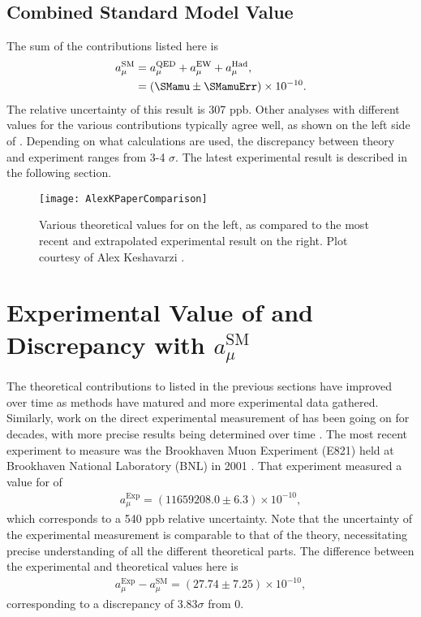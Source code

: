 \subsection{Combined Standard Model Value}

The sum of the \amu contributions listed here is
		\begin{equation}
		\begin{aligned}
            a_{\mu}^{\text{SM}} &= a_{\mu}^{\text{QED}} + a_{\mu}^{\text{EW}} + a_{\mu}^{\text{Had}}, \\
			&= (\SMamu \pm \SMamuErr) \times 10^{-10}.
		\end{aligned}
		\end{equation}
The relative uncertainty of this result is 307 ppb. Other analyses with different values for the various contributions typically agree well, as shown on the left side of . Depending on what calculations are used, the discrepancy between theory and experiment ranges from 3-4 $\sigma$. The latest experimental result is described in the following section.

\begin{figure}[]
	\centering
	\texttt{[image: AlexKPaperComparison]}
	\caption[Comparison between theoretical and experimental values for \amu]{Various theoretical values for \amu on the left, as compared to the most recent and extrapolated experimental result on the right. Plot courtesy of Alex Keshavarzi \cite{Keshavarzi:2018mgv}.}
	\label{fig:AlexKPaperComparison}
\end{figure}


\section{Experimental Value of \amu and Discrepancy with \texorpdfstring{$a_{\mu}^{\text{SM}}$}{amusm}}
\label{sec:Background}


The theoretical contributions to \amu listed in the previous sections have improved over time as methods have matured and more experimental data gathered. Similarly, work on the direct experimental measurement of \amu has been going on for decades, with more precise results being determined over time \cite{PastExperiments}. The most recent experiment to measure \gmtwo was the Brookhaven Muon \gmtwo Experiment (E821) held at Brookhaven National Laboratory (BNL) in 2001 \cite{E821FinalReport}. That experiment measured a value for \amu of 
		\begin{align}
            a_{\mu}^{\text{Exp}} = (11659208.0 \pm 6.3) \times 10^{-10},
		\end{align}
which corresponds to a 540 ppb relative uncertainty. Note that the uncertainty of the experimental measurement is comparable to that of the theory, necessitating precise understanding of all the different theoretical parts. The difference between the experimental and theoretical values here is
		\begin{align}
            a_{\mu}^{\text{Exp}} - a_{\mu}^{\text{SM}} = (27.74 \pm 7.25) \times 10^{-10},
		\end{align}
corresponding to a discrepancy of 3.83$\sigma$ from 0.




